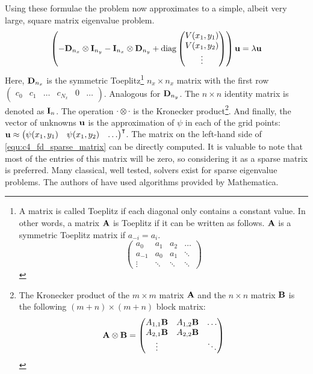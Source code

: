 Using these formulae the problem now approximates to a simple, albeit very large, square matrix eigenvalue problem.
\begin{equation}\label{equ:c4_fd_sparse_matrix}
    \left(-\vb{D}_{n_x} \otimes \vb{I}_{n_y} - \vb{I}_{n_x} \otimes \vb{D}_{n_y} +  \operatorname{diag}\begin{pmatrix}V(x_1, y_1) \\ V(x_1, y_2) \\ \vdots \end{pmatrix} \right)\vb{u} = \lambda \vb{u}
\end{equation}
Here, $\vb{D}_{n_x}$ is the symmetric Toeplitz\footnote{A matrix is called Toeplitz if each diagonal only contains a constant value. In other words, a matrix $\vb{A}$ is Toeplitz if it can be written as follows. $\vb{A}$ is a symmetric Toeplitz matrix if $a_{-i} = a_i$. $$\begin{pmatrix} a_0 & a_1 & a_2 & \dots \\ a_{-1} & a_0 & a_1 & \ddots \\ \vdots & \ddots & \ddots & \ddots \end{pmatrix}$$} $n_x \times n_x$ matrix with the first row $\begin{pmatrix} c_0 & c_1 & \dots & c_{N_x} & 0 & \dots \end{pmatrix}$. Analogous for $\vb{D}_{n_y}$. The $n\times n$ identity matrix is denoted as $\vb{I}_n$. The operation $\cdot \otimes \cdot$ is the Kronecker product\footnote{The Kronecker product of the $m\times m$ matrix $\vb{A}$ and the $n\times n$ matrix $\vb{B}$ is the following $(m+n)\times (m+n)$ block matrix: $$ \vb{A} \otimes \vb{B} = \begin{pmatrix} A_{1,1} \vb{B} & A_{1,2} \vb{B} & \dots \\ A_{2,1} \vb{B} & A_{2,2} \vb{B} & \\ \vdots & & \ddots \end{pmatrix} $$}. And finally, the vector of unknowns $\vb{u}$ is the approximation of $\psi$ in each of the grid points: $\vb{u} \approx {\begin{pmatrix} \psi(x_1, y_1) & \psi(x_1, y_2) & \dots \end{pmatrix}}^\intercal$. The matrix on the left-hand side of \eqref{equ:c4_fd_sparse_matrix} can be directly computed. It is valuable to note that most of the entries of this matrix will be zero, so considering it as a sparse matrix is preferred. Many classical, well tested,  solvers exist for sparse eigenvalue problems. The authors of \cite{wang_new_2009} have used algorithms provided by Mathematica.

